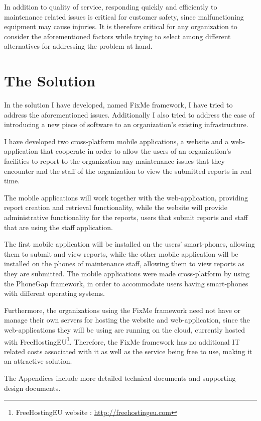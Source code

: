 \documentclass[12pt]{ecsproject}     %
\begin{document}
In addition to quality of service, responding quickly and efficiently to maintenance related issues is critical for customer safety, since malfunctioning equipment may cause injuries. It is therefore critical for any organization to consider the aforementioned factors while trying to select among different alternatives for addressing the problem at hand.

\section{The Solution}
In the solution I have developed, named FixMe framework, I have tried to address the aforementioned issues. Additionally I also tried to address the ease of introducing a new piece of software to an organization's existing infrastructure.

I have developed two cross-platform mobile applications, a website and a web-application that cooperate in order to allow the users of an organization's facilities to report to the organization any maintenance issues that they encounter and the staff of the organization to view the submitted reports in real time.

The mobile applications will work together with the web-application, providing report creation and retrieval functionality, while the website will provide administrative functionality for the reports, users that submit reports and staff that are using the staff application.

The first mobile application will be installed on the users' smart-phones, allowing them to submit and view reports, while the other mobile application will be installed on the phones of maintenance staff, allowing them to view reports as they are submitted. The mobile applications were made cross-platform by using the PhoneGap framework, in order to accommodate users having smart-phones with different operating systems.

Furthermore, the organizations using the FixMe framework need not have or manage their own servers for hosting the website and web-application, since the web-applications they will be using are running on the cloud, currently hosted with FreeHostingEU\footnote{FreeHostingEU website : \href{http://freehostingeu.com}{http://freehostingeu.com}}. Therefore, the FixMe framework has no additional IT related costs associated with it as well as the service being free to use, making it an attractive solution.

The Appendices include more detailed technical documents and supporting design documents.
\end{document}
